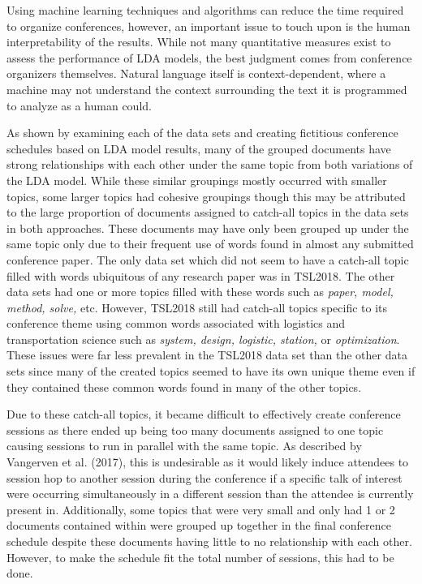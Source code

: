 \documentclass[a4paper, 12pt, twoside]{article}
\numberwithin{equation}{section} %
\begin{document}
Using machine learning techniques and algorithms can reduce the time required to organize conferences, however, an important issue to touch upon is the human interpretability of the results. While not many quantitative measures exist to assess the performance of LDA models, the best judgment comes from conference organizers themselves. Natural language itself is context-dependent, where a machine may not understand the context surrounding the text it is programmed to analyze as a human could. 

As shown by examining each of the data sets and creating fictitious conference schedules based on LDA model results, many of the grouped documents have strong relationships with each other under the same topic from both variations of the LDA model. While these similar groupings mostly occurred with smaller topics, some larger topics had cohesive groupings though this may be attributed to the large proportion of documents assigned to catch-all topics in the data sets in both approaches. These documents may have only been grouped up under the same topic only due to their frequent use of words found in almost any submitted conference paper. The only data set which did not seem to have a catch-all topic filled with words ubiquitous of any research paper was in TSL2018. The other data sets had one or more topics filled with these words such as \textit{paper, model, method, solve,} etc. However, TSL2018 still had catch-all topics specific to its conference theme using common words associated with logistics and transportation science such as \textit{system, design, logistic, station,} or \textit{optimization}. These issues were far less prevalent in the TSL2018 data set than the other data sets since many of the created topics seemed to have its own unique theme even if they contained these common words found in many of the other topics. 

Due to these catch-all topics, it became difficult to effectively create conference sessions as there ended up being too many documents assigned to one topic causing sessions to run in parallel with the same topic. As described by Vangerven et al. (2017), this is undesirable as it would likely induce attendees to session hop to another session during the conference if a specific talk of interest were occurring simultaneously in a different session than the attendee is currently present in. Additionally, some topics that were very small and only had 1 or 2 documents contained within were grouped up together in the final conference schedule despite these documents having little to no relationship with each other. However, to make the schedule fit the total number of sessions, this had to be done. 
\end{document}
